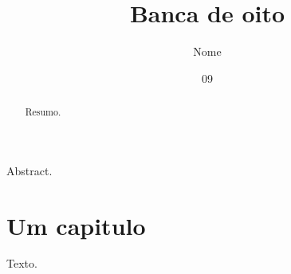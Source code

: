 \documentclass[dsc,orientadorexamina]{ufrj}
\title{Banca de oito}
\author{Nome}{Sobrenome}
\date{09}{2026}
\begin{document}
  \maketitle
  \frontmatter
  \begin{abstract}Resumo.\end{abstract}
  \begin{foreignabstract}Abstract.\end{foreignabstract}
  \tableofcontents
  \mainmatter
  \chapter{Um capitulo}
  Texto.
\end{document}
